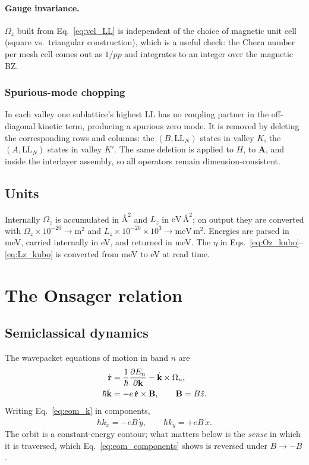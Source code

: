 \documentclass[11pt]{article}
\newcommand{\Ang}{\text{\AA}}
\newcommand{\kb}{\mathbf{k}}
\newcommand{\rb}{\mathbf{r}}
\newcommand{\Om}{\Omega}
\newcommand{\Bfield}{B}
\begin{document}
\paragraph{Gauge invariance.}
$\Om_z$ built from Eq.~\eqref{eq:vel_LL} is independent of the choice of
magnetic unit cell (square vs.\ triangular construction), which is a
useful check: the Chern number per mesh cell comes out as $1/pp$ and
integrates to an integer over the magnetic BZ.

\subsubsection{Spurious-mode chopping}\label{sec:chop}

In each valley one sublattice's highest LL has no coupling partner in
the off-diagonal kinetic term, producing a spurious zero mode.  It is
removed by deleting the corresponding rows and columns: the $(B,
\mathrm{LL}_N)$ states in valley $K$, the $(A, \mathrm{LL}_N)$ states in
valley $K'$.  The same deletion is applied to $H$, to $\mathbf{A}$, and
inside the interlayer assembly, so all operators remain
dimension-consistent.

\subsection{Units}

Internally $\Om_z$ is accumulated in $\Ang^2$ and $L_z$ in
$\mathrm{eV}\,\Ang^2$; on output they are converted with
$\Om_z \times 10^{-20} \to \mathrm{m}^2$ and
$L_z \times 10^{-20}\times 10^{3} \to \mathrm{meV}\,\mathrm{m}^2$.
Energies are parsed in meV, carried internally in eV, and returned in
meV.  The $\eta$ in Eqs.~\eqref{eq:Oz_kubo}--\eqref{eq:Lz_kubo} is
converted from meV to eV at read time.

\section{The Onsager relation}\label{sec:onsager}

\subsection{Semiclassical dynamics}

The wavepacket equations of motion in band $n$ are
\begin{align}
  \dot{\rb} &= \frac{1}{\hbar}\pdv{E_n}{\kb} - \dot{\kb}\times \Om_n, \\
  \hbar\dot{\kb} &= -e\,\dot{\rb}\times \mathbf{B},
  \qquad \mathbf{B} = \Bfield\hat{z}.
  \label{eq:eom_k}
\end{align}
Writing Eq.~\eqref{eq:eom_k} in components,
\begin{equation}\label{eq:eom_components}
  \hbar \dot{k}_x = -e\Bfield\,\dot{y},
  \qquad
  \hbar \dot{k}_y = +e\Bfield\,\dot{x}.
\end{equation}
The orbit is a constant-energy contour; what matters below is the
\emph{sense} in which it is traversed, which Eq.~\eqref{eq:eom_components}
shows is reversed under $\Bfield \to -\Bfield$.
\end{document}

